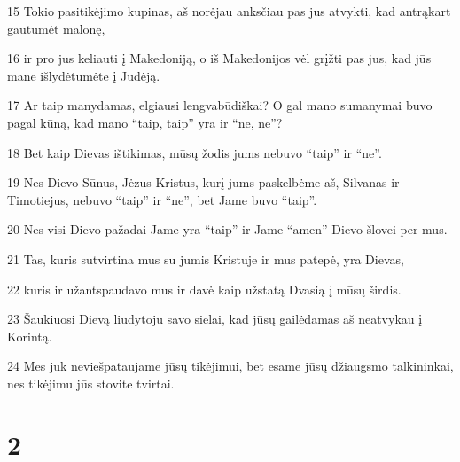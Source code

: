 \par 15 Tokio pasitikėjimo kupinas, aš norėjau anksčiau pas jus atvykti, kad antrąkart gautumėt malonę, 
\par 16 ir pro jus keliauti į Makedoniją, o iš Makedonijos vėl grįžti pas jus, kad jūs mane išlydėtumėte į Judėją. 
\par 17 Ar taip manydamas, elgiausi lengvabūdiškai? O gal mano sumanymai buvo pagal kūną, kad mano “taip, taip” yra ir “ne, ne”? 
\par 18 Bet kaip Dievas ištikimas, mūsų žodis jums nebuvo “taip” ir “ne”. 
\par 19 Nes Dievo Sūnus, Jėzus Kristus, kurį jums paskelbėme aš, Silvanas ir Timotiejus, nebuvo “taip” ir “ne”, bet Jame buvo “taip”. 
\par 20 Nes visi Dievo pažadai Jame yra “taip” ir Jame “amen” Dievo šlovei per mus. 
\par 21 Tas, kuris sutvirtina mus su jumis Kristuje ir mus patepė, yra Dievas, 
\par 22 kuris ir užantspaudavo mus ir davė kaip užstatą Dvasią į mūsų širdis. 
\par 23 Šaukiuosi Dievą liudytoju savo sielai, kad jūsų gailėdamas aš neatvykau į Korintą. 
\par 24 Mes juk neviešpataujame jūsų tikėjimui, bet esame jūsų džiaugsmo talkininkai, nes tikėjimu jūs stovite tvirtai.


\chapter{2}



